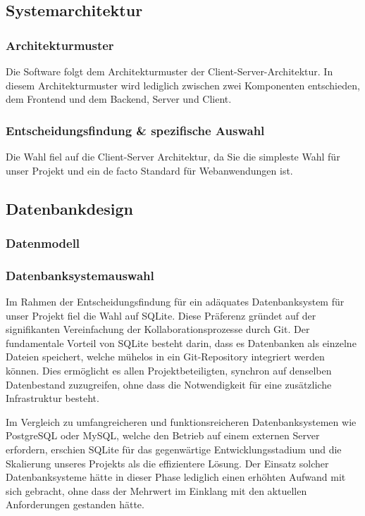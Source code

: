 \documentclass[../main.tex]{subfiles} %
\begin{document}
\subsection{Systemarchitektur} %

\subsubsection{Architekturmuster}

Die Software folgt dem Architekturmuster der Client-Server-Architektur. In diesem Architekturmuster wird lediglich zwischen zwei Komponenten entschieden, dem Frontend und dem Backend, Server und Client.


\subsubsection{Entscheidungsfindung \& spezifische Auswahl}

Die Wahl fiel auf die Client-Server Architektur, da Sie die simpleste Wahl für unser Projekt und ein de facto Standard für Webanwendungen ist.

\subsection{Datenbankdesign} %

\subsubsection{Datenmodell}

\subsubsection{Datenbanksystemauswahl}
Im Rahmen der Entscheidungsfindung für ein adäquates Datenbanksystem für unser Projekt fiel die Wahl auf SQLite. 
Diese Präferenz gründet auf der signifikanten Vereinfachung der Kollaborationsprozesse durch Git. Der fundamentale Vorteil von SQLite besteht darin, dass es Datenbanken als einzelne Dateien speichert, welche mühelos in ein Git-Repository integriert werden können. 
Dies ermöglicht es allen Projektbeteiligten, synchron auf denselben Datenbestand zuzugreifen, ohne dass die Notwendigkeit für eine zusätzliche Infrastruktur besteht.

Im Vergleich zu umfangreicheren und funktionsreicheren Datenbanksystemen wie PostgreSQL oder MySQL, welche den Betrieb auf einem externen Server erfordern, erschien SQLite für das gegenwärtige Entwicklungsstadium und die Skalierung unseres Projekts als die effizientere Lösung. Der Einsatz solcher Datenbanksysteme hätte in dieser Phase lediglich einen erhöhten Aufwand mit sich gebracht, ohne dass der Mehrwert im Einklang mit den aktuellen Anforderungen gestanden hätte.
\end{document}
